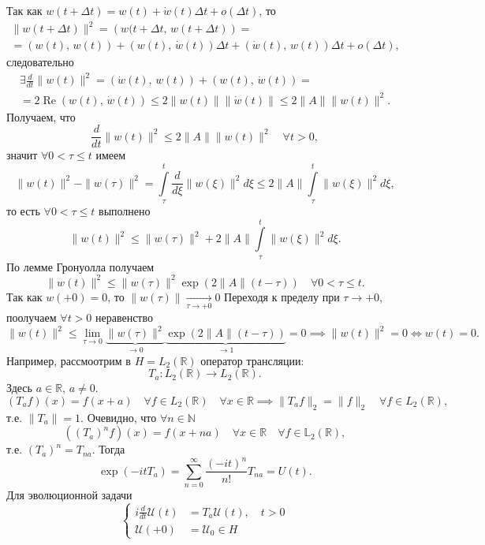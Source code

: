 \documentclass[a4paper]{article}
\begin{document}
Так как $w(t+\Delta t)= w(t) + \dot{w} (t) \Delta t +o(\Delta t)$, то
\begin{multline*}
	\| w(t+\Delta t)\|^2 =\left( w(t+\Delta t,\, w (t+\Delta t) \right) =\\=\left( w(t),\,w(t) \right) +
	\left( w(t),\, \dot{w}(t) \right) \Delta t+
	\left( \dot{w}(t),\, w(t) \right) \Delta t+ o(\Delta t)
 ,\end{multline*}
следовательно
\begin{multline*}
	\exists \frac{d}{dt} \| w(t)\|^2 =\left( \dot{w}(t),\,
	w(t)\right) +\left( w(t),\,\dot{w}(t) \right) =\\=
	2 \operatorname{Re} \left( w(t),\,\dot{w}(t) \right) \le 
	2\| w(t)\|\left\lVert \dot{w}(t)\right\rVert\le 
	2 \| A\|\| w(t)\|^2
.\end{multline*} 
Получаем, что
\[
	\frac{d}{dt} \| w(t)\|^2\le 2 \| A\|\| w(t)\|^2 \quad
	\forall t>0
,\] 
значит $\forall 0 <\tau \le  t$ имеем
\[
	\| w(t)\|^2-\| w(\tau)\|^2=
	\int\limits_{\tau}^{t} \frac{d}{d\xi}\| w(\xi)\|^2 d\xi
	\le 2 \| A\| \int\limits_{\tau}^{t} \| w(\xi)\|^2 d\xi, 
\]
то есть $\forall 0 < \tau \le t$ выполнено
\[
	\| w(t)\|^2 \le \| w(\tau)\|^2+ 2\| A\|\int\limits_{\tau}^{t} 
	\| w(\xi)\|^2 d\xi.
\] 
По лемме Гронуолла получаем
\[
	\| w(t)\|^2\le \| w(\tau)\|^2 \exp \left( 2 \| A\|(t-\tau) \right) \quad \forall 0 < \tau \le t
.\] 
Так как $w(+0)=0$, то  $\| w(\tau)\|\xrightarrow[\tau\to +0]{} 0$ 
Переходя к пределу при $\tau\to +0$, поолучаем $\forall t>0$
неравенство
\[
	\| w(t)\|^2 \le \lim_{\tau \to 0} \underbrace{\| w(\tau)\|^2}_{\to 0} \underbrace{\exp\left( 2 \| A\|(t-\tau) \right)}_{\to 1}=0
	\implies \| w(t)\|^2=0 \Leftrightarrow w(t) =0
.\] 
Например, рассмоотрим в $H=L_2(\mathbb{R})$ оператор трансляции:
\[
	T_a: L_2(\mathbb{R})\to L_2 (\mathbb{R})
.\] 
Здесь $a \in \mathbb{R}, \, a \neq 0$.
\[
	(T_a f)(x) =f(x+a) \quad \forall f \in  L_2(\mathbb{R})
	\quad \forall x \in \mathbb{R}\implies
	\| T_a f\|_2=\| f\|_2 \quad \forall f \in L_2(\mathbb{R})
 ,\]
 т.\:е. $\| T_a\|=1$. Очевидно, что $\forall n \in \mathbb{N}$ 
 \[
	 \left( (T_a)^n f \right) (x) =f(x+na) \quad \forall x \in 
	 \mathbb{R} \quad \forall f \in \mathbb{L}_2(\mathbb{R})
  ,\]
  т.\:е. $(T_a)^n=T_{na}$. Тогда
 \[
	 \exp (-i t T_a)= \sum_{n=0}^{\infty} \frac{(-it)^n}{n!}T_{na}=U(t)
 .\]
 Для эволюционной задачи
 \[
 \left\{
 \begin{aligned}
	 i \frac{d}{dt} \mathcal{U}(t)&= T_a \mathcal{U}(t), \quad
	 t> 0\\
	 \mathcal{U}(+0)&=\mathcal{U}_0 \in H
 \end{aligned}
 \right.
 \]
\end{document}
